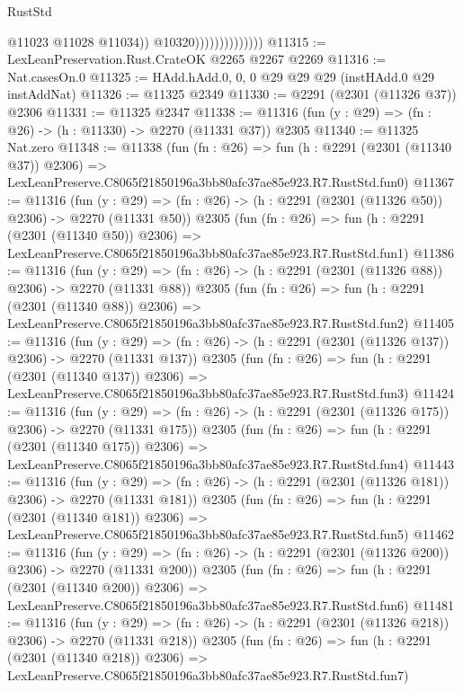 \begin{lexlean}{RustStd}
\begin{coremodule}
                                    @11023
                                    @11028
                                    @11034))
                                @10320))))))))))))))
@11315 := LexLeanPreservation.Rust.CrateOK @2265 @2267 @2269
@11316 := Nat.casesOn.{0}
@11325 := HAdd.hAdd.{0, 0, 0} @29 @29 @29 (instHAdd.{0} @29 instAddNat)
@11326 := @11325 @2349
@11330 := @2291 (@2301 (@11326 @37)) @2306
@11331 := @11325 @2347
@11338 := @11316 (fun (y : @29) => (fn : @26) -> (h : @11330) -> @2270 (@11331 @37)) @2305
@11340 := @11325 Nat.zero
@11348 := @11338
    (fun (fn : @26) =>
    fun (h : @2291 (@2301 (@11340 @37)) @2306) =>
    LexLeanPreserve.C8065f21850196a3bb80afc37ae85e923.R7.RustStd.fun0)
@11367 := @11316
    (fun (y : @29) => (fn : @26) -> (h : @2291 (@2301 (@11326 @50)) @2306) -> @2270 (@11331 @50))
    @2305
    (fun (fn : @26) =>
    fun (h : @2291 (@2301 (@11340 @50)) @2306) =>
    LexLeanPreserve.C8065f21850196a3bb80afc37ae85e923.R7.RustStd.fun1)
@11386 := @11316
    (fun (y : @29) => (fn : @26) -> (h : @2291 (@2301 (@11326 @88)) @2306) -> @2270 (@11331 @88))
    @2305
    (fun (fn : @26) =>
    fun (h : @2291 (@2301 (@11340 @88)) @2306) =>
    LexLeanPreserve.C8065f21850196a3bb80afc37ae85e923.R7.RustStd.fun2)
@11405 := @11316
    (fun (y : @29) => (fn : @26) -> (h : @2291 (@2301 (@11326 @137)) @2306) -> @2270 (@11331 @137))
    @2305
    (fun (fn : @26) =>
    fun (h : @2291 (@2301 (@11340 @137)) @2306) =>
    LexLeanPreserve.C8065f21850196a3bb80afc37ae85e923.R7.RustStd.fun3)
@11424 := @11316
    (fun (y : @29) => (fn : @26) -> (h : @2291 (@2301 (@11326 @175)) @2306) -> @2270 (@11331 @175))
    @2305
    (fun (fn : @26) =>
    fun (h : @2291 (@2301 (@11340 @175)) @2306) =>
    LexLeanPreserve.C8065f21850196a3bb80afc37ae85e923.R7.RustStd.fun4)
@11443 := @11316
    (fun (y : @29) => (fn : @26) -> (h : @2291 (@2301 (@11326 @181)) @2306) -> @2270 (@11331 @181))
    @2305
    (fun (fn : @26) =>
    fun (h : @2291 (@2301 (@11340 @181)) @2306) =>
    LexLeanPreserve.C8065f21850196a3bb80afc37ae85e923.R7.RustStd.fun5)
@11462 := @11316
    (fun (y : @29) => (fn : @26) -> (h : @2291 (@2301 (@11326 @200)) @2306) -> @2270 (@11331 @200))
    @2305
    (fun (fn : @26) =>
    fun (h : @2291 (@2301 (@11340 @200)) @2306) =>
    LexLeanPreserve.C8065f21850196a3bb80afc37ae85e923.R7.RustStd.fun6)
@11481 := @11316
    (fun (y : @29) => (fn : @26) -> (h : @2291 (@2301 (@11326 @218)) @2306) -> @2270 (@11331 @218))
    @2305
    (fun (fn : @26) =>
    fun (h : @2291 (@2301 (@11340 @218)) @2306) =>
    LexLeanPreserve.C8065f21850196a3bb80afc37ae85e923.R7.RustStd.fun7)

\end{coremodule}
\end{lexlean}
